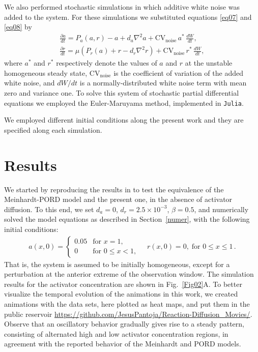 \documentclass[%
 preprint,
 aip, 
 amsmath,amssymb,
]{revtex4-2}
\begin{document}
We also performed stochastic simulations in which additive white noise was added to the system. For these simulations we substituted equations \eqref{eq07} and
	\eqref{eq08} by
	\begin{subequations}\label{eq1112}
		\begin{gather}
		\frac{\partial a}{dt} = P_a(a, r) - a + d_a \nabla^2 a + \text{CV}_{\text{noise}} \, a^* \,\frac{dW}{dt}, \label{eq11} \\
		\frac{\partial r}{dt}= \mu (P_r(a) + r - d_r \nabla^2 r) + \text{CV}_{\text{noise}} \, r^* \,\frac{dW}{dt}, \label{eq12}
		\end{gather}
	\end{subequations}
where $a^*$ and $r^*$ respectively denote the  values of  $a$ and $r$ at the unstable homogeneous steady state, $\text{CV}_{\text{noise}}$ is the coefficient of variation of the added white noise, and $dW/dt$ is a normally-distributed white noise term with mean zero and variance one. To solve this system of stochastic partial differential equations we employed the Euler-Maruyama method, implemented in \texttt{Julia}.
	
We employed different initial conditions along the present work and they are specified along each simulation.

\section{Results}
\label{res}
	
We started by reproducing the results in \cite{Cotterell2015} to test the equivalence of the Meinhardt-PORD model and the present one, in the absence of activator diffusion. To this end, we set $d_a=0$, $d_r = 2.5\times10^{-3}$, $\beta = 0.5$, and numerically solved the model equations as described in Section~\ref{numer}, with the following initial conditions:
	\begin{gather}
	a(x, 0) = \left\{\begin{array}{cl}
	0.05 & \text{for } x = 1, \\
	0 & \text{for } 0 \leq x < 1,
	\end{array} \right. 
	\quad
	r(x, 0) = 0, \; \text{for } 0 \leq x \leq 1\,.
	\end{gather}
That is, the system is assumed to be initially homogeneous, except for a perturbation at the anterior extreme of the observation window. The simulation results for the activator concentration are shown in Fig.~\ref{Fig02}A. To better visualize the temporal evolution of the animations in this work, we created animations with the data sets, here plotted as heat maps, and put them in the public reservoir \url{https://github.com/JesusPantoja/Reaction-Diffusion_Movies/}. Observe that an oscillatory behavior gradually gives rise to a steady pattern, consisting of alternated high and low activator concentration regions, in agreement with the reported behavior of the Meinhardt \cite{Meinhardt1982} and PORD \citep{Cotterell2015} models. 
	
\end{document}

